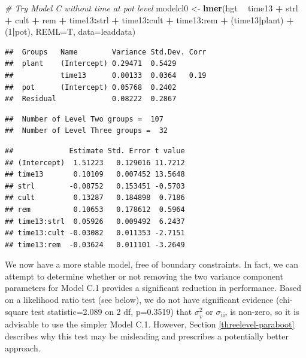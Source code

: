 \documentclass[
]{krantz}
\newenvironment{Shaded}{\begin{snugshade}}{\end{snugshade}}
\newcommand{\CommentTok}[1]{\textcolor[rgb]{0.37,0.37,0.37}{\textit{#1}}}
\newcommand{\DataTypeTok}[1]{\textcolor[rgb]{0.27,0.27,0.27}{#1}}
\newcommand{\DecValTok}[1]{\textcolor[rgb]{0.06,0.06,0.06}{#1}}
\newcommand{\KeywordTok}[1]{\textcolor[rgb]{0.27,0.27,0.27}{\textbf{#1}}}
\newcommand{\NormalTok}[1]{#1}
\newcommand{\OperatorTok}[1]{\textcolor[rgb]{0.43,0.43,0.43}{\textbf{#1}}}
\newcommand{\StringTok}[1]{\textcolor[rgb]{0.5,0.5,0.5}{#1}}
\begin{document}
\begin{Shaded}
\begin{Highlighting}[]
\CommentTok{# Try Model C without time at pot level}
\NormalTok{modelcl0 <-}\StringTok{ }\KeywordTok{lmer}\NormalTok{(hgt }\OperatorTok{~}\StringTok{ }\NormalTok{time13 }\OperatorTok{+}\StringTok{ }\NormalTok{strl }\OperatorTok{+}\StringTok{ }\NormalTok{cult }\OperatorTok{+}\StringTok{ }\NormalTok{rem }\OperatorTok{+}\StringTok{ }
\StringTok{    }\NormalTok{time13}\OperatorTok{:}\NormalTok{strl }\OperatorTok{+}\StringTok{ }\NormalTok{time13}\OperatorTok{:}\NormalTok{cult }\OperatorTok{+}\StringTok{ }\NormalTok{time13}\OperatorTok{:}\NormalTok{rem }\OperatorTok{+}\StringTok{ }\NormalTok{(time13}\OperatorTok{|}\NormalTok{plant) }\OperatorTok{+}
\StringTok{    }\NormalTok{(}\DecValTok{1}\OperatorTok{|}\NormalTok{pot), }\DataTypeTok{REML=}\NormalTok{T, }\DataTypeTok{data=}\NormalTok{leaddata)}
\end{Highlighting}
\end{Shaded}

\begin{verbatim}
##  Groups   Name        Variance Std.Dev. Corr
##  plant    (Intercept) 0.29471  0.5429       
##           time13      0.00133  0.0364   0.19
##  pot      (Intercept) 0.05768  0.2402       
##  Residual             0.08222  0.2867
\end{verbatim}

\begin{verbatim}
##  Number of Level Two groups =  107 
##  Number of Level Three groups =  32
\end{verbatim}

\begin{verbatim}
##             Estimate Std. Error t value
## (Intercept)  1.51223   0.129016 11.7212
## time13       0.10109   0.007452 13.5648
## strl        -0.08752   0.153451 -0.5703
## cult         0.13287   0.184898  0.7186
## rem          0.10653   0.178612  0.5964
## time13:strl  0.05926   0.009492  6.2437
## time13:cult -0.03082   0.011353 -2.7151
## time13:rem  -0.03624   0.011101 -3.2649
\end{verbatim}

We now have a more stable model, free of boundary constraints. In fact, we can attempt to determine whether or not removing the two variance component parameters for Model C.1 provides a significant reduction in performance. Based on a likelihood ratio test (see below), we do not have significant evidence (chi-square test statistic=2.089 on 2 df, p=0.3519) that \(\sigma_{\tilde{v}}^{2}\) or \(\sigma_{\tilde{u}\tilde{v}}\) is non-zero, so it is advisable to use the simpler Model C.1. However, Section \ref{threelevel-paraboot} describes why this test may be misleading and prescribes a potentially better approach.
\end{document}
